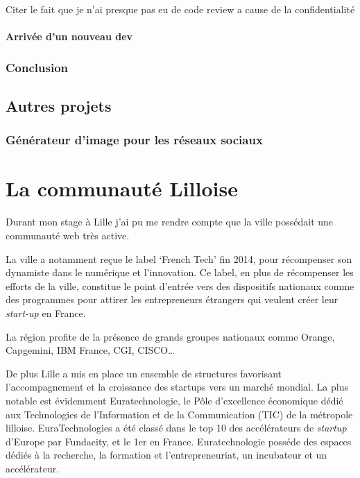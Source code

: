 Citer le fait que je n'ai presque pas eu de code review a cause de la
confidentialité

\paragraph{Arrivée d'un nouveau dev}\label{arrivuxe9e-dun-nouveau-dev}

\subsubsection{Conclusion}\label{conclusion-1}

\subsection{Autres projets}\label{autres-projets}

\subsubsection{Générateur d'image pour les réseaux
sociaux}\label{guxe9nuxe9rateur-dimage-pour-les-ruxe9seaux-sociaux}

\newpage

\section{La communauté Lilloise}\label{la-communautuxe9-lilloise}

Durant mon stage à Lille j'ai pu me rendre compte que la ville possédait
une communauté web très active.

\bigskip

La ville a notamment reçue le label `French Tech' fin 2014, pour
récompenser son dynamiste dans le numérique et l'innovation. Ce label,
en plus de récompenser les efforts de la ville, constitue le point
d'entrée vers des dispositifs nationaux comme des programmes pour
attirer les entrepreneurs étrangers qui veulent créer leur
\emph{start-up} en France.

\bigskip

La région profite de la présence de grands groupes nationaux comme
Orange, Capgemini, IBM France, CGI, CISCO\ldots{}

\bigskip

De plus Lille a mis en place un ensemble de structures favorisant
l'accompagnement et la croissance des startups vers un marché mondial.
La plus notable est évidemment Euratechnologie, le Pôle d'excellence
économique dédié aux Technologies de l'Information et de la
Communication (TIC) de la métropole lilloise. EuraTechnologies a été
classé dans le top 10 des accélérateurs de \emph{startup} d'Europe par
Fundacity, et le 1er en France. Euratechnologie posséde des espaces
dédiés à la recherche, la formation et l'entrepreneuriat, un incubateur
et un accélérateur.

